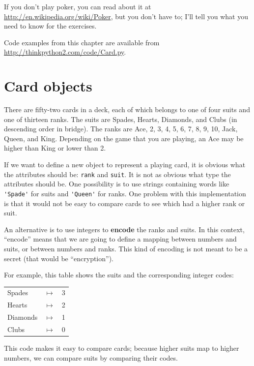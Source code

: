 \documentclass[10pt]{book}
\begin{document}
If you don't play
poker, you can read about it at
\url{http://en.wikipedia.org/wiki/Poker}, but you don't have to; I'll
tell you what you need to know for the exercises.

Code examples from
this chapter are available from
\url{http://thinkpython2.com/code/Card.py}.


\section{Card objects}

There are fifty-two cards in a deck, each of which belongs to one of
four suits and one of thirteen ranks.  The suits are Spades, Hearts,
Diamonds, and Clubs (in descending order in bridge).  The ranks are
Ace, 2, 3, 4, 5, 6, 7, 8, 9, 10, Jack, Queen, and King.  Depending on
the game that you are playing, an Ace may be higher than King
or lower than 2.

If we want to define a new object to represent a playing card, it is
obvious what the attributes should be: {\tt rank} and
{\tt suit}.  It is not as obvious what type the attributes
should be.  One possibility is to use strings containing words like
\verb"'Spade'" for suits and \verb"'Queen'" for ranks.  One problem with
this implementation is that it would not be easy to compare cards to
see which had a higher rank or suit.

An alternative is to use integers to {\bf encode} the ranks and suits.
In this context, ``encode'' means that we are going to define a mapping
between numbers and suits, or between numbers and ranks.  This
kind of encoding is not meant to be a secret (that
would be ``encryption'').

\newcommand{\mymapsto}{$\mapsto$}

For example, this table shows the suits and the corresponding integer
codes:

\begin{tabular}{l c l}
Spades & \mymapsto & 3 \\
Hearts & \mymapsto & 2 \\
Diamonds & \mymapsto & 1 \\
Clubs & \mymapsto & 0
\end{tabular}

This code makes it easy to compare cards; because higher suits map to
higher numbers, we can compare suits by comparing their codes.
\end{document}
